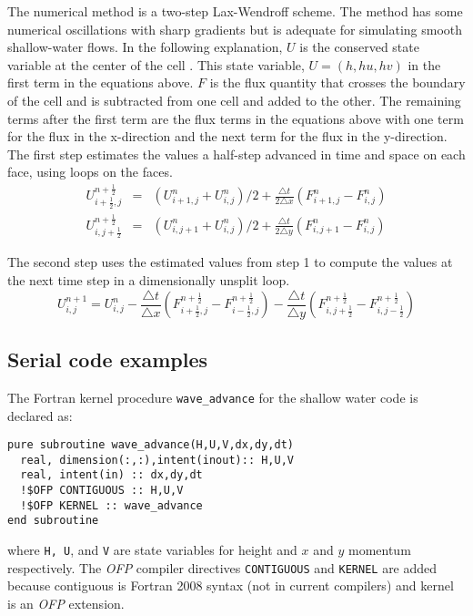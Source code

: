 The numerical method is a two-step Lax-Wendroff scheme. The method
has some numerical oscillations with sharp gradients but is adequate
for simulating smooth shallow-water flows. In the following explanation,
$U$ is the conserved state variable at the center of the cell . This
state variable, $U=(h,hu,hv)$ in the first term in the equations
above. $F$ is the flux quantity that crosses the boundary of the cell
and is subtracted from one cell and added to the other. The remaining
terms after the first term are the flux terms in the equations above
with one term for the flux in the x-direction and the next term for
the flux in the y-direction. The first step estimates the values a
half-step advanced in time and space on each face, using loops on
the faces.\begin{eqnarray*}
U_{i+\frac{1}{2},j}^{n+\frac{1}{2}} & = & (U_{i+1,j}^{n}+U_{i,j}^{n})/2+\frac{\triangle t}{2\triangle x}\left(F_{i+1,j}^{n}-F_{i,j}^{n}\right)\\
U_{i,j+\frac{1}{2}}^{n+\frac{1}{2}} & = & (U_{i,j+1}^{n}+U_{i,j}^{n})/2+\frac{\triangle t}{2\triangle y}\left(F_{i,j+1}^{n}-F_{i,j}^{n}\right)\end{eqnarray*}


The second step uses the estimated values from step 1 to compute the
values at the next time step in a dimensionally unsplit loop.\[
U_{i,j}^{n+1}=U_{i,j}^{n}-\frac{\triangle t}{\triangle x}(F_{i+\frac{1}{2},j}^{n+\frac{1}{2}}-F_{i-\frac{1}{2},j}^{n+\frac{1}{2}})-\frac{\triangle t}{\triangle y}(F_{i,j+\frac{1}{2}}^{n+\frac{1}{2}}-F_{i,j-\frac{1}{2}}^{n+\frac{1}{2}})\]


\subsection{Serial code examples}

The Fortran kernel procedure {\tt wave\_advance} for the shallow water code
is declared as:

{\small
\begin{verbatim}
pure subroutine wave_advance(H,U,V,dx,dy,dt)
  real, dimension(:,:),intent(inout):: H,U,V
  real, intent(in) :: dx,dy,dt
  !$OFP CONTIGUOUS :: H,U,V
  !$OFP KERNEL :: wave_advance
end subroutine
\end{verbatim}
}

where {\tt H, U}, and {\tt V} are state variables for height and
$x$ and $y$ momentum respectively.  The \emph{OFP} compiler directives
{\tt CONTIGUOUS} and {\tt KERNEL} are added because contiguous is Fortran
2008 syntax (not in current compilers) and kernel is an \emph{OFP} extension.

